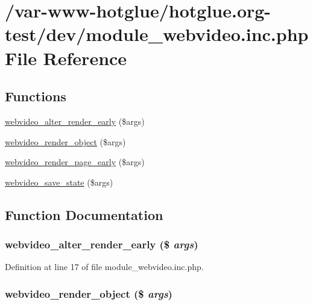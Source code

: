 \hypertarget{module__webvideo_8inc_8php}{
\section{/var-\/www-\/hotglue/hotglue.org-\/test/dev/module\_\-webvideo.inc.php File Reference}
\label{module__webvideo_8inc_8php}
}
\subsection*{Functions}
\begin{DoxyCompactItemize}
\item 
\hyperlink{module__webvideo_8inc_8php_ac80ed52a5c0c172ceed781db379b5a90}{webvideo\_\-alter\_\-render\_\-early} (\$args)
\item 
\hyperlink{module__webvideo_8inc_8php_aeb27081a684b517b2b6dea26b8a2c905}{webvideo\_\-render\_\-object} (\$args)
\item 
\hyperlink{module__webvideo_8inc_8php_a347f107ab60e260a4fa7807291c67867}{webvideo\_\-render\_\-page\_\-early} (\$args)
\item 
\hyperlink{module__webvideo_8inc_8php_ab1ecc6e1e1827b95191ee72f4cddef3d}{webvideo\_\-save\_\-state} (\$args)
\end{DoxyCompactItemize}


\subsection{Function Documentation}
\hypertarget{module__webvideo_8inc_8php_ac80ed52a5c0c172ceed781db379b5a90}{
\subsubsection[{webvideo\_\-alter\_\-render\_\-early}]{\setlength{\rightskip}{0pt plus 5cm}webvideo\_\-alter\_\-render\_\-early (\$ {\em args})}}
\label{module__webvideo_8inc_8php_ac80ed52a5c0c172ceed781db379b5a90}


Definition at line 17 of file module\_\-webvideo.inc.php.

\hypertarget{module__webvideo_8inc_8php_aeb27081a684b517b2b6dea26b8a2c905}{
\subsubsection[{webvideo\_\-render\_\-object}]{\setlength{\rightskip}{0pt plus 5cm}webvideo\_\-render\_\-object (\$ {\em args})}}
\label{module__webvideo_8inc_8php_aeb27081a684b517b2b6dea26b8a2c905}


